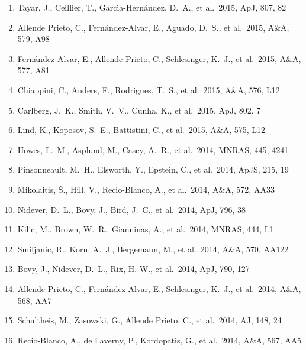 \documentclass[12pt]{article}
\begin{document}
\begin{enumerate}
\item Tayar, J., Ceillier, T., 
Garc{\'{\i}}a-Hern{\'a}ndez, D.~A., et al.\ 2015, ApJ, 807, 82 


\item Allende Prieto, C., Fern{\'a}ndez-Alvar, E., Aguado, D.~S., et al.\ 2015, A\&A, 579, A98 


\item  Fern{\'a}ndez-Alvar, E., Allende Prieto, C., Schlesinger, K.~J., et al.\ 2015, A\&A, 577, A81 


\item Chiappini, C., Anders, F., Rodrigues, T.~S., et al.\ 2015, A\&A, 576, L12 


\item Carlberg, J.~K., Smith, V.~V., Cunha, K., et al.\ 2015, ApJ, 802, 7 


\item Lind, K., Koposov, S.~E., Battistini, C., et al.\ 2015, A\&A, 575, L12 


\item Howes, L.~M., Asplund, 
M., Casey, A.~R., et al.\ 2014, MNRAS, 445, 4241 


\item Pinsonneault, 
M.~H., Elsworth, Y., Epstein, C., et al.\ 2014, ApJS, 215, 19 


\item Mikolaitis, {\v S}., Hill, V., Recio-Blanco, A., et al.\ 2014, A\&A, 572, AA33 


\item Nidever, D.~L., Bovy, 
J., Bird, J.~C., et al.\ 2014, ApJ, 796, 38 


\item Kilic, M., Brown, W.~R., 
Gianninas, A., et al.\ 2014, MNRAS, 444, L1 


\item Smiljanic, R., Korn, A.~J., Bergemann, M., et al.\ 2014, A\&A, 570, AA122 


\item Bovy, J., Nidever, D.~L., 
Rix, H.-W., et al.\ 2014, ApJ, 790, 127 


\item Allende Prieto, C., Fern{\'a}ndez-Alvar, E., Schlesinger, K.~J., et al.\ 2014, A\&A, 568, AA7 


\item Schultheis, M., 
Zasowski, G., Allende Prieto, C., et al.\ 2014, AJ, 148, 24 


\item Recio-Blanco, A., de Laverny, P., Kordopatis, G., et al.\ 2014, A\&A, 567, AA5 



\end{enumerate}
\end{document}
